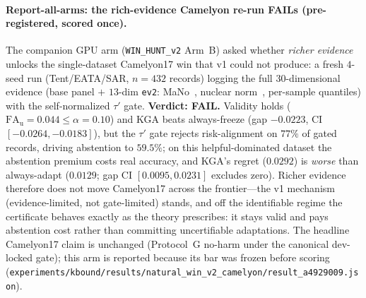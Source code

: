 \documentclass[conference]{IEEEtran}
\theoremstyle{plain}
\theoremstyle{definition}
\begin{document}
\paragraph{Report-all-arms: the rich-evidence Camelyon re-run FAILs (pre-registered, scored once).}
The companion GPU arm (\texttt{WIN\_HUNT\_v2} Arm~B) asked whether \emph{richer evidence} unlocks
the single-dataset Camelyon17 win that v1 could not produce: a fresh $4$-seed run
(Tent/EATA/SAR, $n{=}432$ records) logging the full $30$-dimensional evidence (base panel $+$
$13$-dim \texttt{ev2}: MaNo~\cite{xie2024mano}, nuclear norm~\cite{deng2023confidence},
per-sample quantiles) with the self-normalized $\tau'$ gate. \textbf{Verdict: FAIL.} Validity holds
($\mathrm{FA}_{\mathrm u}{=}0.044\le\alpha{=}0.10$) and \textsc{KGA} beats always-freeze
(gap $-0.0223$, CI $[-0.0264,-0.0183]$), but the $\tau'$ gate rejects risk-alignment on $77\%$
of gated records, driving abstention to $59.5\%$; on this helpful-dominated dataset the
abstention premium costs real accuracy, and \textsc{KGA}'s regret ($0.0292$) is \emph{worse}
than always-adapt ($0.0129$; gap CI $[0.0095,0.0231]$ excludes zero). Richer evidence therefore
does not move Camelyon17 across the frontier---the v1 mechanism (evidence-limited, not
gate-limited) stands, and off the identifiable regime the certificate behaves exactly as the
theory prescribes: it stays valid and pays abstention cost rather than committing uncertifiable
adaptations. The headline Camelyon17 claim is unchanged (Protocol~G no-harm under the canonical
dev-locked gate); this arm is reported because its bar was frozen before scoring
(\texttt{experiments/kbound/results/natural\_win\_v2\_camelyon/result\_a4929009.json}).
\end{document}
